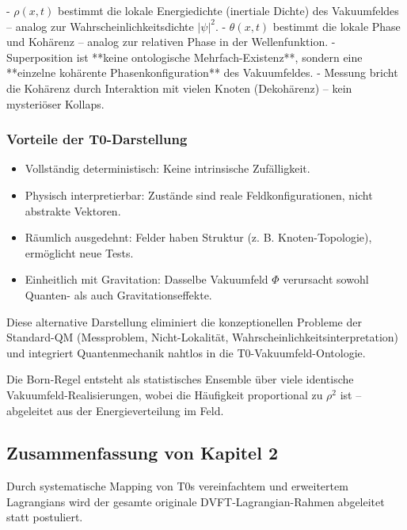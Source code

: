 	- $\rho(x,t)$ bestimmt die lokale Energiedichte (inertiale Dichte) des Vakuumfeldes – analog zur Wahrscheinlichkeitsdichte $|\psi|^2$.
	- $\theta(x,t)$ bestimmt die lokale Phase und Kohärenz – analog zur relativen Phase in der Wellenfunktion.
	- Superposition ist **keine ontologische Mehrfach-Existenz**, sondern eine **einzelne kohärente Phasenkonfiguration** des Vakuumfeldes.
	- Messung bricht die Kohärenz durch Interaktion mit vielen Knoten (Dekohärenz) – kein mysteriöser Kollaps.
	
	\subsubsection{Vorteile der T0-Darstellung}
	
	\begin{itemize}
		\item Vollständig deterministisch: Keine intrinsische Zufälligkeit.
		\item Physisch interpretierbar: Zustände sind reale Feldkonfigurationen, nicht abstrakte Vektoren.
		\item Räumlich ausgedehnt: Felder haben Struktur (z. B. Knoten-Topologie), ermöglicht neue Tests.
		\item Einheitlich mit Gravitation: Dasselbe Vakuumfeld $\Phi$ verursacht sowohl Quanten- als auch Gravitationseffekte.
	\end{itemize}
	
	Diese alternative Darstellung eliminiert die konzeptionellen Probleme der Standard-QM (Messproblem, Nicht-Lokalität, Wahrscheinlichkeitsinterpretation) und integriert Quantenmechanik nahtlos in die T0-Vakuumfeld-Ontologie.
	
	Die Born-Regel entsteht als statistisches Ensemble über viele identische Vakuumfeld-Realisierungen, wobei die Häufigkeit proportional zu $\rho^2$ ist – abgeleitet aus der Energieverteilung im Feld.
	
	\subsection{Zusammenfassung von Kapitel 2}
	
	Durch systematische Mapping von T0s vereinfachtem und erweitertem Lagrangians wird der gesamte originale DVFT-Lagrangian-Rahmen abgeleitet statt postuliert.
	
